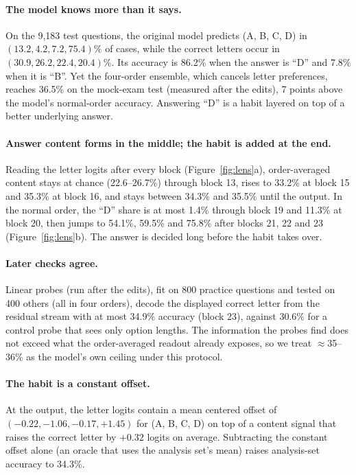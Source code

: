 \documentclass[11pt]{article}
\begin{document}
\paragraph{The model knows more than it says.} On the 9{,}183 test questions, the original model predicts (A, B, C, D) in $(13.2, 4.2, 7.2, 75.4)\%$ of cases, while the correct letters occur in $(30.9, 26.2, 22.4, 20.4)\%$. Its accuracy is 86.2\% when the answer is ``D'' and 7.8\% when it is ``B''. Yet the four-order ensemble, which cancels letter preferences, reaches 36.5\% on the mock-exam test (measured after the edits), 7 points above the model's normal-order accuracy. Answering ``D'' is a habit layered on top of a better underlying answer.

\paragraph{Answer content forms in the middle; the habit is added at the end.} Reading the letter logits after every block (Figure~\ref{fig:lens}a), order-averaged content stays at chance (22.6--26.7\%) through block 13, rises to 33.2\% at block 15 and 35.3\% at block 16, and stays between 34.3\% and 35.5\% until the output. In the normal order, the ``D'' share is at most 1.4\% through block 19 and 11.3\% at block 20, then jumps to 54.1\%, 59.5\% and 75.8\% after blocks 21, 22 and 23 (Figure~\ref{fig:lens}b). The answer is decided long before the habit takes over.

\paragraph{Later checks agree.} Linear probes (run after the edits), fit on 800 practice questions and tested on 400 others (all in four orders), decode the displayed correct letter from the residual stream with at most 34.9\% accuracy (block 23), against 30.6\% for a control probe that sees only option lengths. The information the probes find does not exceed what the order-averaged readout already exposes, so we treat $\approx$35--36\% as the model's own ceiling under this protocol.

\paragraph{The habit is a constant offset.} At the output, the letter logits contain a mean centered offset of $(-0.22,-1.06,-0.17,+1.45)$ for (A, B, C, D) on top of a content signal that raises the correct letter by $+0.32$ logits on average. Subtracting the constant offset alone (an oracle that uses the analysis set's mean) raises analysis-set accuracy to 34.3\%.
\end{document}
